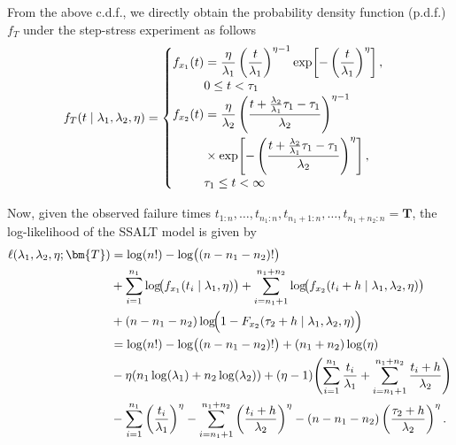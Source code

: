 \documentclass{article}
\begin{document}
From the above c.d.f., we directly obtain the probability density function (p.d.f.) $f_T$ under the step-stress experiment as follows
\begin{equation}
f_T(t \mid \lambda_1,\lambda_2,\eta)=
\begin{cases}
\begin{aligned}
f_{x_1}(t) &=
\frac{\eta}{\lambda_1}
\left(\frac{t}{\lambda_1}\right)^{\eta-1}
\exp\!\left[
-\left(\frac{t}{\lambda_1}\right)^{\eta}
\right],
\\[-0.2em]
&\hfill 0 \le t < \tau_1
\end{aligned}
\\[0.6em]
\begin{aligned}
f_{x_2}(t) &=
\frac{\eta}{\lambda_2}
\left(
\frac{t + \frac{\lambda_2}{\lambda_1}\tau_1 - \tau_1}
{\lambda_2}
\right)^{\eta-1}
\\
& \times
\exp\!\left[
-\left(
\frac{t + \frac{\lambda_2}{\lambda_1}\tau_1 - \tau_1}
{\lambda_2}
\right)^{\eta}
\right],
\\[-0.2em]
&\hfill \tau_1 \le t < \infty
\end{aligned} \nonumber
\end{cases}
\end{equation}




Now, given the observed failure times $t_{1:n}, \dots, t_{n_1:n}, t_{n_1+1:n}, \dots, t_{n_1+n_2:n}=\bm{T}$, the log-likelihood of the SSALT model is given by
\begin{align}
\ell(\lambda_1,\lambda_2,\eta;
\bm{T})
&= \log(n!)
 - \log\bigl((n-n_1-n_2)!\bigr)
\nonumber\\
&
+ \sum_{i=1}^{n_1}
\log\!\bigl(f_{x_1}(t_i \mid \lambda_1,\eta)\bigr)
+\sum_{i=n_1+1}^{n_1+n_2}
\log\!\bigl(f_{x_2}(t_i+h \mid \lambda_1,\lambda_2,\eta)\bigr)
\nonumber\\
&
+ (n-n_1-n_2)
\log\!\Bigl(
1 - F_{x_2}(\tau_2+h \mid \lambda_1,\lambda_2,\eta)
\Bigr)  \nonumber
\\ 
&= \log(n!)
 - \log\bigl((n-n_1-n_2)!\bigr)
+ (n_1+n_2)\log(\eta)\nonumber
\\
&- \eta\!\left(
n_1\log(\lambda_1)
+ n_2\log(\lambda_2)
\right)+ (\eta-1)\!\left(
\sum_{i=1}^{n_1}\frac{t_i}{\lambda_1}
+ \sum_{i=n_1+1}^{n_1+n_2}\frac{t_i+h}{\lambda_2}
\right)
\nonumber\\
&
- \sum_{i=1}^{n_1}
\left(\frac{t_i}{\lambda_1}\right)^{\eta}
- \sum_{i=n_1+1}^{n_1+n_2}
\left(\frac{t_i+h}{\lambda_2}\right)^{\eta}- (n-n_1-n_2)
\left(\frac{\tau_2+h}{\lambda_2}\right)^{\eta}.
\label{eq:likelihood}
\end{align}
\end{document}
